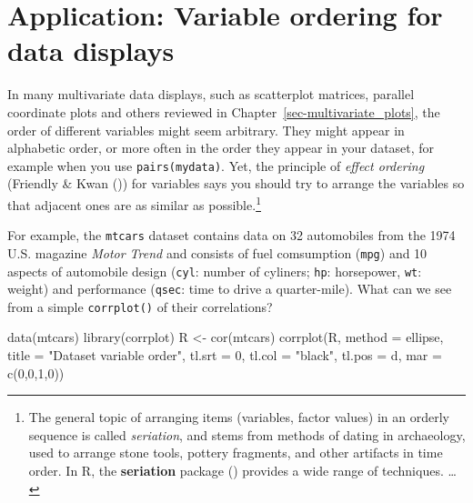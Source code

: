 \documentclass[
  letterpaper,
  10pt,
  krantz2]{krantz}
\makeatletter
\newenvironment{Shaded}{\begin{snugshade}}{\end{snugshade}}
\newcommand{\AttributeTok}[1]{\textcolor[rgb]{0.40,0.45,0.13}{#1}}
\newcommand{\DecValTok}[1]{\textcolor[rgb]{0.68,0.00,0.00}{#1}}
\newcommand{\FunctionTok}[1]{\textcolor[rgb]{0.28,0.35,0.67}{#1}}
\newcommand{\NormalTok}[1]{\textcolor[rgb]{0.00,0.23,0.31}{#1}}
\newcommand{\OtherTok}[1]{\textcolor[rgb]{0.00,0.23,0.31}{#1}}
\newcommand{\StringTok}[1]{\textcolor[rgb]{0.13,0.47,0.30}{#1}}
\newenvironment{kframe}{%
  \medskip{}
  \setlength{\fboxsep}{.8em}
  \def\at@end@of@kframe{}%
  \ifinner\ifhmode%
  \def\at@end@of@kframe{\end{minipage}}%
  \begin{minipage}{\columnwidth}%
  \fi\fi%
  \def\FrameCommand##1{\hskip\@totalleftmargin \hskip-\fboxsep
  \colorbox{shadecolor}{##1}\hskip-\fboxsep
      \hskip-\linewidth \hskip-\@totalleftmargin \hskip\columnwidth}%
  \MakeFramed {\advance\hsize-\width
    \@totalleftmargin\z@ \linewidth\hsize
    \@setminipage}}%
{\par\unskip\endMakeFramed%
  \at@end@of@kframe}
\renewenvironment{Shaded}{\begin{kframe}}{\end{kframe}}
\makeatother
\begin{document}
\section{Application: Variable ordering for data
displays}\label{sec-var-order}

In many multivariate data displays, such as scatterplot matrices,
parallel coordinate plots and others reviewed in
Chapter~\ref{sec-multivariate_plots}, the order of different variables
might seem arbitrary. They might appear in alphabetic order, or more
often in the order they appear in your dataset, for example when you use
\texttt{pairs(mydata)}. Yet, the principle of \emph{effect ordering}
(Friendly \& Kwan ()) for
variables says you should try to arrange the variables so that adjacent
ones are as similar as possible.\footnote{The general topic of arranging
  items (variables, factor values) in an orderly sequence is called
  \emph{seriation}, and stems from methods of dating in archaeology,
  used to arrange stone tools, pottery fragments, and other artifacts in
  time order. In R, the \textbf{seriation} package
  () provides a wide
  range of techniques. \ldots{}}

For example, the \texttt{mtcars} dataset contains data on 32 automobiles
from the 1974 U.S. magazine \emph{Motor Trend} and consists of fuel
comsumption (\texttt{mpg}) and 10 aspects of automobile design
(\texttt{cyl}: number of cyliners; \texttt{hp}: horsepower, \texttt{wt}:
weight) and performance (\texttt{qsec}: time to drive a quarter-mile).
What can we see from a simple \texttt{corrplot()} of their correlations?

\begin{Shaded}
\begin{Highlighting}[]
\FunctionTok{data}\NormalTok{(mtcars)}
\FunctionTok{library}\NormalTok{(corrplot)}
\NormalTok{R }\OtherTok{\textless{}{-}} \FunctionTok{cor}\NormalTok{(mtcars)}
\FunctionTok{corrplot}\NormalTok{(R, }
         \AttributeTok{method =} \StringTok{\textquotesingle{}ellipse\textquotesingle{}}\NormalTok{,}
         \AttributeTok{title =} \StringTok{"Dataset variable order"}\NormalTok{,}
         \AttributeTok{tl.srt =} \DecValTok{0}\NormalTok{, }\AttributeTok{tl.col =} \StringTok{"black"}\NormalTok{, }\AttributeTok{tl.pos =} \StringTok{\textquotesingle{}d\textquotesingle{}}\NormalTok{,}
         \AttributeTok{mar =} \FunctionTok{c}\NormalTok{(}\DecValTok{0}\NormalTok{,}\DecValTok{0}\NormalTok{,}\DecValTok{1}\NormalTok{,}\DecValTok{0}\NormalTok{))}
\end{Highlighting}
\end{Shaded}
\end{document}

